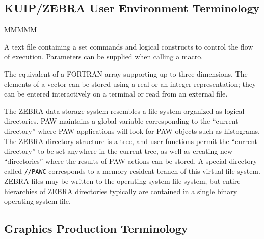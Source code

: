 \subsection*{KUIP/ZEBRA User Environment Terminology}

\begin{DL}{MMMMM}
\item[Macro]     A text file containing a set commands 
                 and logical constructs to control the flow of execution. 
                 Parameters can be supplied when calling a macro.
\item[Vector]    The equivalent of a FORTRAN array supporting 
                 up to three dimensions.
                 The elements of a vector can be stored using a real or an
                 integer representation;
                 they can be entered interactively on a terminal or read
                 from an external file.
\item[Logical Directory\ ]
                 The ZEBRA data storage system resembles a file system organized
                 as logical directories.  PAW maintains
                 a global variable corresponding to the ``current directory'' where
                 PAW applications will look for PAW objects such as histograms.
                 The ZEBRA directory structure is a tree, and user functions permit
                 the ``current directory'' to be set anywhere in the current tree,
                 as well as creating new ``directories'' where the results
                 of PAW actions can be stored.  A special
                 directory called \texttt{//PAWC} corresponds to a memory-resident
                 branch of this virtual file system.  ZEBRA files may be written
                 to the operating system file system, but entire hierarchies of
                 ZEBRA directories typically are contained in a single binary operating
                 system file.
\end{DL}

\subsection*{Graphics Production Terminology}

